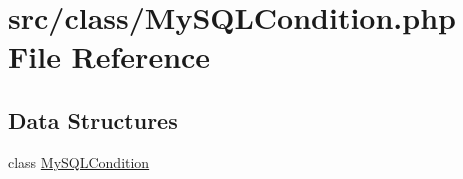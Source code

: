 \hypertarget{_my_s_q_l_condition_8php}{}\section{src/class/\+My\+S\+Q\+L\+Condition.php File Reference}
\label{_my_s_q_l_condition_8php}
\subsection*{Data Structures}
\begin{DoxyCompactItemize}
\item 
class \hyperlink{class_my_s_q_l_condition}{My\+S\+Q\+L\+Condition}
\end{DoxyCompactItemize}
